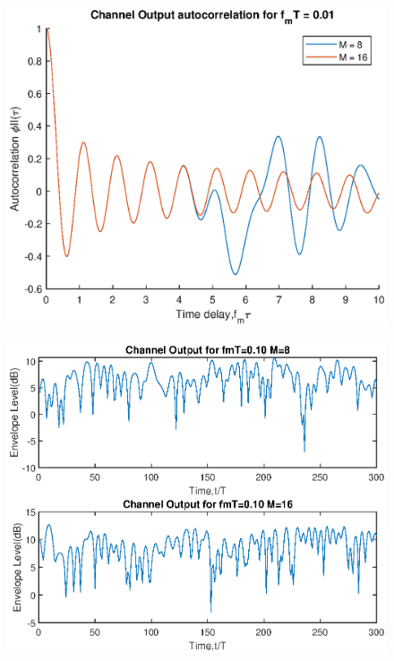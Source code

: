 \begin{figure}[H]
    \centering
    \includegraphics[scale = 0.9]{ss_auto_001.eps}
\end{figure}
\begin{figure}[H]
    \centering
    \includegraphics[scale = 0.9]{ss_envelop_01.eps}
\end{figure}
